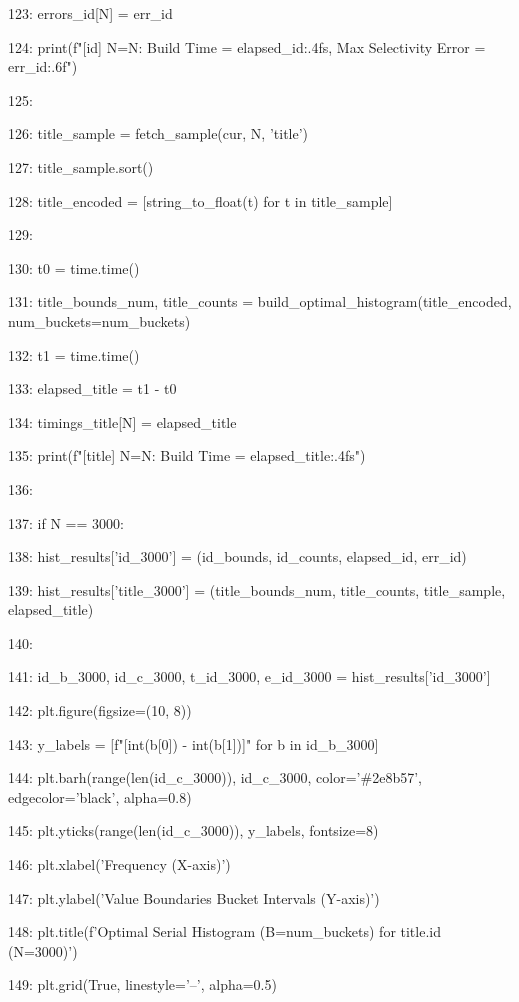 \documentclass[11pt,a4paper]{article}
\begin{document}
{{{123:         errors\_id[N] = err\_id

124:         print(f"[id] N={N}: Build Time = {elapsed\_id:.4f}s, Max Selectivity Error = {err\_id:.6f}")

125:

126:         title\_sample = fetch\_sample(cur, N, 'title')

127:         title\_sample.sort()

128:         title\_encoded = [string\_to\_float(t) for t in title\_sample]

129:

130:         t0 = time.time()

131:         title\_bounds\_num, title\_counts = build\_optimal\_histogram(title\_encoded, num\_buckets=num\_buckets)

132:         t1 = time.time()

133:         elapsed\_title = t1 - t0

134:         timings\_title[N] = elapsed\_title

135:         print(f"[title] N={N}: Build Time = {elapsed\_title:.4f}s")

136:

137:         if N == 3000:

138:             hist\_results['id\_3000'] = (id\_bounds, id\_counts, elapsed\_id, err\_id)

139:             hist\_results['title\_3000'] = (title\_bounds\_num, title\_counts, title\_sample, elapsed\_title)

140:

141:     id\_b\_3000, id\_c\_3000, t\_id\_3000, e\_id\_3000 = hist\_results['id\_3000']

142:     plt.figure(figsize=(10, 8))

143:     y\_labels = [f"[{int(b[0])} - {int(b[1])}]" for b in id\_b\_3000]

144:     plt.barh(range(len(id\_c\_3000)), id\_c\_3000, color='\#2e8b57', edgecolor='black', alpha=0.8)

145:     plt.yticks(range(len(id\_c\_3000)), y\_labels, fontsize=8)

146:     plt.xlabel('Frequency (X-axis)')

147:     plt.ylabel('Value Boundaries Bucket Intervals (Y-axis)')

148:     plt.title(f'Optimal Serial Histogram (B={num\_buckets}) for title.id (N=3000)')

149:     plt.grid(True, linestyle='--', alpha=0.5)

}}}
\end{document}
